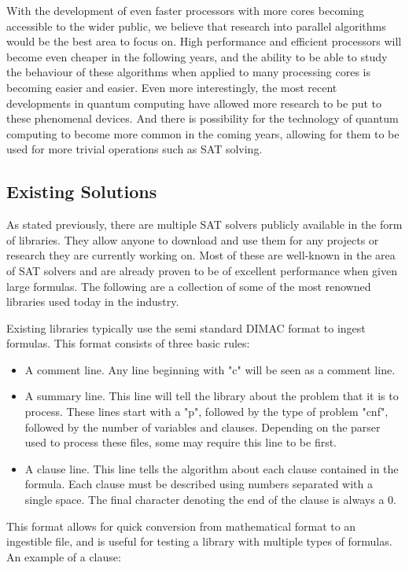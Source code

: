 \documentclass{article}
\begin{document}
    With the development of even faster processors with more cores becoming accessible to the wider public, we believe that research into
    parallel algorithms would be the best area to focus on. High performance and efficient processors will become even cheaper in the
    following years, and the ability to be able to study the behaviour of these algorithms when applied to many processing cores is becoming
    easier and easier. Even more interestingly, the most recent developments in quantum computing have allowed more research to be put to
    these phenomenal devices. And there is possibility for the technology of quantum computing to become more common in the coming years,
    allowing for them to be used for more trivial operations such as SAT solving.


\subsection{Existing Solutions}
As stated previously, there are multiple SAT solvers publicly available in the form of libraries. They allow anyone to download and use them
for any projects or research they are currently working on. Most of these are well-known in the area of SAT solvers and are already proven
to be of excellent performance when given large formulas. The following are a collection of some of the most renowned libraries used today
in the industry.

Existing libraries typically use the semi standard DIMAC format to ingest formulas. This format consists of three basic rules:

\begin{itemize}
    \item A comment line. Any line beginning with "c" will be seen as a comment line.
    \item A summary line. This line will tell the library about the problem that it is to process. These lines start with a "p", followed by
          the type of problem "cnf", followed by the number of variables and clauses. Depending on the parser used to process these files,
          some may require this line to be first.
    \item A clause line. This line tells the algorithm about each clause contained in the formula. Each clause must be described using
          numbers separated with a single space. The final character denoting the end of the clause is always a 0.
\end{itemize}

This format allows for quick conversion from mathematical format to an ingestible file, and is useful for testing a library with multiple
types of formulas. An example of a clause:
\end{document}
